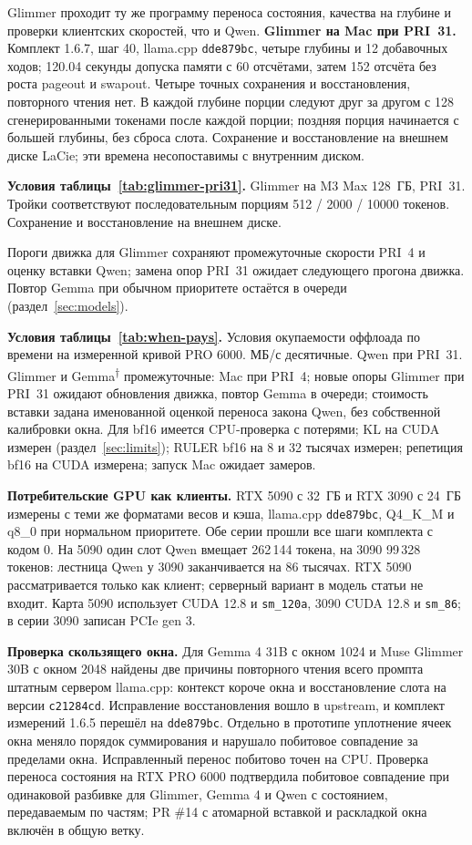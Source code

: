 Glimmer проходит ту же программу переноса состояния, качества на глубине и проверки клиентских скоростей, что и Qwen.
\textbf{Glimmer на Mac при PRI~31.} Комплект 1.6.7, шаг 40, llama.cpp \texttt{dde879bc},
четыре глубины и 12 добавочных ходов; 120.04 секунды допуска памяти с 60 отсчётами,
затем 152 отсчёта без роста pageout и swapout. Четыре точных сохранения и восстановления,
повторного чтения нет. В каждой глубине порции следуют друг за другом с 128 сгенерированными токенами
после каждой порции; поздняя порция начинается с большей глубины, без сброса слота.
Сохранение и восстановление на внешнем диске LaCie; эти времена несопоставимы с внутренним диском.

\textbf{Условия таблицы~\ref{tab:glimmer-pri31}.} Glimmer на M3 Max 128~ГБ, PRI~31. Тройки соответствуют последовательным порциям
512 / 2000 / 10000 токенов. Сохранение и восстановление на внешнем диске.

Пороги движка для Glimmer сохраняют промежуточные скорости PRI~4 и оценку вставки Qwen;
замена опор PRI~31 ожидает следующего прогона движка.
Повтор Gemma при обычном приоритете остаётся в очереди (раздел~\ref{sec:models}).


\textbf{Условия таблицы~\ref{tab:when-pays}.} Условия окупаемости оффлоада по времени на измеренной кривой PRO 6000. МБ/с десятичные.
Qwen при PRI~31. Glimmer и Gemma\textsuperscript{†} промежуточные: Mac при PRI~4; новые опоры Glimmer при PRI~31 ожидают обновления движка, повтор Gemma в очереди;
стоимость вставки задана именованной оценкой переноса закона Qwen, без собственной калибровки окна.
Для bf16 имеется CPU-проверка с потерями; KL на CUDA измерен (раздел~\ref{sec:limits}); RULER bf16 на 8 и 32 тысячах измерен; репетиция bf16 на CUDA измерена; запуск Mac ожидает замеров.

\textbf{Потребительские GPU как клиенты.} RTX 5090 с 32~ГБ и RTX 3090 с 24~ГБ измерены с теми же форматами весов и кэша,
llama.cpp \texttt{dde879bc}, Q4\_K\_M и q8\_0 при нормальном приоритете. Обе серии прошли все шаги комплекта с кодом 0.
На 5090 один слот Qwen вмещает 262\,144 токена, на 3090 99\,328 токенов: лестница Qwen у 3090 заканчивается на 86 тысячах.
RTX 5090 рассматривается только как клиент; серверный вариант в модель статьи не входит.
Карта 5090 использует CUDA 12.8 и \texttt{sm\_120a}, 3090 CUDA 12.8 и \texttt{sm\_86}; в серии 3090 записан PCIe gen 3.

\textbf{Проверка скользящего окна.} Для Gemma 4 31B с окном 1024 и Muse Glimmer 30B
с окном 2048 найдены две причины повторного чтения всего промпта штатным сервером llama.cpp:
контекст короче окна и восстановление слота на версии \texttt{c21284cd}.
Исправление восстановления вошло в upstream, и комплект измерений 1.6.5 перешёл на \texttt{dde879bc}.
Отдельно в прототипе уплотнение ячеек окна меняло порядок суммирования и нарушало побитовое
совпадение за пределами окна. Исправленный перенос побитово точен на CPU. Проверка переноса состояния на RTX PRO 6000
подтвердила побитовое совпадение при одинаковой разбивке для Glimmer, Gemma 4 и Qwen
с состоянием, передаваемым по частям; PR \#14 с атомарной вставкой и раскладкой окна включён в общую ветку.

